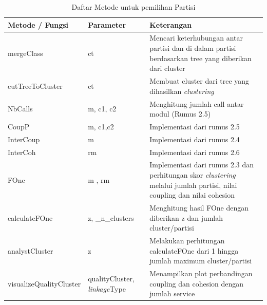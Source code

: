 \begingroup
\setlength{\LTleft}{-20cm plus -1fill}
\setlength{\LTright}{\LTleft}
\begin{small}
	\begin{longtable}{|p{4cm}|p{3cm}|p{6cm}|}
		\caption{Daftar Metode untuk pemilihan Partisi}\\
		\hline
		\textbf{Metode / Fungsi} & \textbf{Parameter} & \textbf{Keterangan}\\
		\endfirsthead
		
		\hline  

		mergeClass
		& ct
		 &  Mencari keterhubungan antar partisi dan di dalam partisi berdasarkan tree yang diberikan dari cluster \\

		 \hline  

		 cutTreeToCluster
		& ct
		 & Membuat cluster dari tree yang dihasilkan \textit{clustering}  \\

		 \hline  

		 NbCalls
		& m, c1, c2
		 & Menghitung jumlah call antar modul (Rumus 2.5) \\

		 \hline  
		 CoupP
		 
		& m, c1,c2
		 & Implementasi dari rumus 2.5   \\

		 \hline  

		 InterCoup
		& m
		 & Implementasi dari rumus 2.4 \\

		 \hline
		
		 InterCoh
		& rm
		 & Implementasi dari rumus 2.6  \\

		 \hline
		 
		 FOne
		& m , rm
		 & Implementasi dari rumus 2.3 dan perhitungan skor \textit{clustering} melalui jumlah partisi, nilai coupling dan nilai cohesion \\

		 \hline
		 calculateFOne
		& z, {\_}n{\_}clusters
		 & Menghitung hasil FOne dengan diberikan z dan jumlah cluster/partisi \\

		 \hline
		 analystCluster
		& z
		 & Melakukan perhitungan calculateFOne dari 1 hingga jumlah maximum cluster/partisi \\ 


		 \hline
		 visualizeQualityCluster
		& qualityCluster, \textit{linkage}Type
		 & Menampilkan plot perbandingan coupling dan cohesion dengan jumlah service  \\

		 \hline
	\end{longtable}
\end{small}
\endgroup

